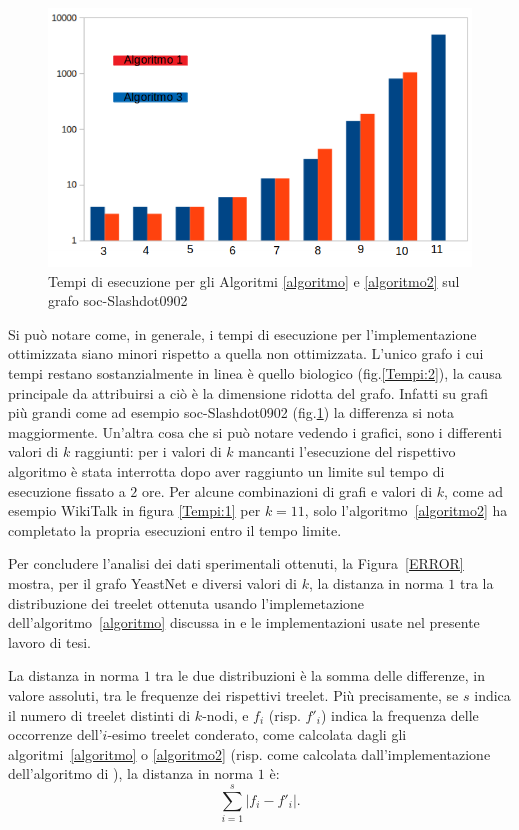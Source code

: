\begin{figure}[htbp]
	\includegraphics[width=\textwidth]{capitolo4/tempiSOC}
	\caption{Tempi di esecuzione per gli Algoritmi \ref{algoritmo} e \ref{algoritmo2} sul grafo soc-Slashdot0902}
	\label{Tempi:4}
\end{figure}

Si può notare come, in generale, i tempi di esecuzione per l'implementazione ottimizzata siano minori rispetto a quella non ottimizzata.
L'unico grafo i cui tempi restano sostanzialmente in linea è quello biologico (fig.\ref{Tempi:2}), la causa principale da attribuirsi a ciò è la dimensione ridotta del grafo. 
Infatti su grafi più grandi come ad esempio soc-Slashdot0902 (fig.\ref{Tempi:4}) la differenza si nota maggiormente. 
Un'altra cosa che si può notare vedendo i grafici, sono i differenti valori di $ k $ raggiunti: per i valori di $k$ mancanti l'esecuzione del rispettivo algoritmo è stata interrotta dopo aver raggiunto un limite sul tempo di esecuzione fissato a $2$ ore.
Per alcune combinazioni di grafi e valori di $k$, come ad esempio WikiTalk in figura \ref{Tempi:1} per $ k=11$, solo l'algoritmo~\ref{algoritmo2} ha completato la propria esecuzioni entro il tempo limite.

Per concludere l'analisi dei dati sperimentali ottenuti,
la Figura~\ref{ERROR} mostra, per il grafo YeastNet e diversi valori di $k$, la distanza in norma $1$ tra 
la distribuzione dei treelet ottenuta usando l'implemetazione dell'algoritmo~\ref{algoritmo} discussa in \cite{bressan2019motivo} e le implementazioni usate nel presente lavoro di tesi.

La distanza in norma $1$ tra le due distribuzioni è la somma delle differenze, in valore assoluti, tra le frequenze dei rispettivi treelet.
Più precisamente, se $s$ indica il numero di treelet distinti di $k$-nodi, e $f_i$ (risp. $f'_i$) indica la frequenza delle occorrenze dell'$i$-esimo treelet  conderato, come calcolata dagli gli algoritmi~\ref{algoritmo} o \ref{algoritmo2} (risp. come calcolata dall'implementazione dell'algoritmo di \cite{bressan2019motivo}), la distanza in norma $1$ è:
\[
	\sum_{i=1}^{s}{\left| f_i - f'_i \right| }.
\]


